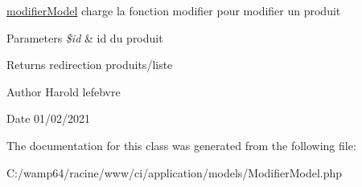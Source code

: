\mbox{\hyperlink{classmodifier_model}{modifier\+Model}} charge la fonction modifier pour modifier un produit 


\begin{DoxyParams}{Parameters}
{\em \$id} & id du produit \\
\hline
\end{DoxyParams}
\begin{DoxyReturn}{Returns}
redirection produits/liste 
\end{DoxyReturn}
\begin{DoxyAuthor}{Author}
Harold lefebvre 
\end{DoxyAuthor}
\begin{DoxyDate}{Date}
01/02/2021 
\end{DoxyDate}


The documentation for this class was generated from the following file\+:\begin{DoxyCompactItemize}
\item 
C\+:/wamp64/racine/www/ci/application/models/Modifier\+Model.\+php\end{DoxyCompactItemize}
